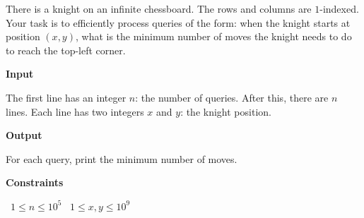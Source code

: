 There is a knight on an infinite chessboard. The rows and columns are $1$-indexed.
Your task is to efficiently process queries of the form: when the knight starts at position $(x,y)$, what is the minimum number of moves the knight needs to do to reach the top-left corner.

\vspace{0.3cm}\noindent\textbf{Input}

The first line has an integer $n$: the number of queries.
After this, there are $n$ lines. Each line has two integers $x$ and $y$: the knight position.

\vspace{0.3cm}\noindent\textbf{Output}

For each query, print the minimum number of moves.

\vspace{0.3cm}\noindent\textbf{Constraints}

\textbullet\ $1 \le n \le 10^5$
\textbullet\ $1 \le x, y \le 10^9$
